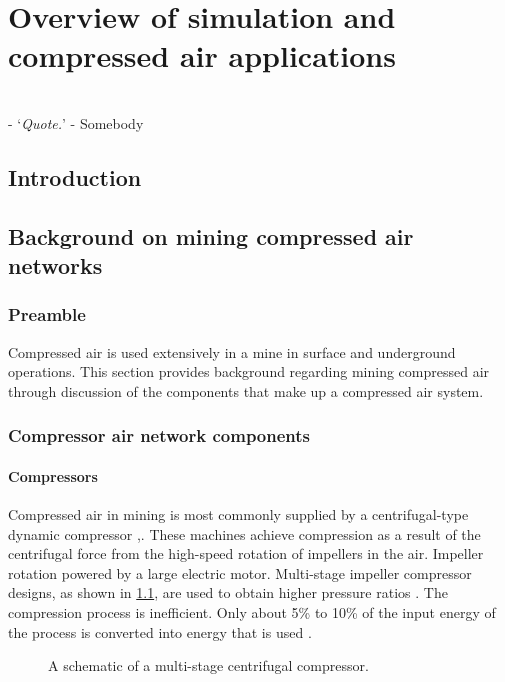 \chapter{Overview of simulation and compressed air applications}
\label{Chap2}
\thispagestyle{empty}
\vspace{38em}
\hrulefill
\\-
\enquote*{\textit{Quote.}} - Somebody\\
\clearpage
\section{Introduction}
\section{Background on mining compressed air networks}
\subsection{Preamble}
Compressed air is used extensively in a mine in surface and underground operations. This section provides background regarding mining compressed air through discussion of the components that make up a compressed air system. 
\subsection{Compressor air network components}
\subsubsection{Compressors}

Compressed air in mining is most commonly supplied by a centrifugal-type dynamic compressor \cite{Fouche2016Masters},\cite{Booysen2012Masters}.  These machines achieve compression as a result of the centrifugal force from the high-speed rotation of impellers in the air. Impeller rotation powered by a large electric motor. Multi-stage impeller compressor designs, as shown in \cref{fig: Compressor diagram}\footnotemark[1], are used to obtain higher pressure ratios \cite{Fouche2016Masters}. The compression process is inefficient. Only about 5\% to 10\% of the input energy of the process is converted into energy that is used \cite{yang2009air}. 
\begin{figure}[h]
	\centering
	\fbox{\hspace{3cm}\hspace{2.5cm}}
	\caption[A scematic of a multistage centrifugal compressor.]{A schematic of a multi-stage centrifugal compressor\protect \footnotemark[1].}
	\label{fig: Compressor diagram}
\end{figure}


